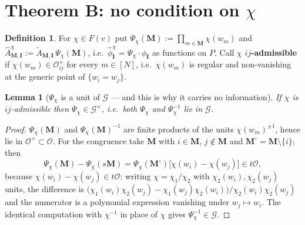 \documentclass[11pt]{article}
\theoremstyle{plain}
\newtheorem{lem}[thm]{Lemma}
\theoremstyle{definition}
\newtheorem{defn}[thm]{Definition}
\theoremstyle{remark}
\theoremstyle{plain}
\newcommand{\bI}{\mathbf{I}}
\newcommand{\bM}{\mathbf{M}}
\newcommand{\At}{\widetilde{A}}
\newcommand{\Ah}{\widehat{A}}
\newcommand{\sm}{\setminus}
\newcommand{\Gkm}{\mathcal{G}}
\begin{document}
\section{Theorem B: no condition on $\chi$}
\label{sec:thmB}

\begin{defn}
For $\chi\in F(v)$ put $\Psi_\chi(\bM):=\prod_{m\in\bM}\chi(w_m)$ and
$\Ah^{\chi}_{\bM,\bI}:=\At_{\bM,\bI}\,\Psi_\chi(\bM)$, i.e.\
$\hat\phi^{\chi}_\bI=\Psi_\chi\cdot\phi_\bI$ as functions on $P$.  Call $\chi$
\textbf{$ij$-admissible} if $\chi(w_m)\in\mathcal{O}_{ij}^{\times}$ for every
$m\in[N]$, i.e.\ $\chi(w_m)$ is regular and non-vanishing at the generic point of
$\{w_i=w_j\}$.
\end{defn}

\begin{lem}[$\Psi_\chi$ is a unit of $\Gkm$ --- and this is why it carries no information]
\label{lem:unit}
If $\chi$ is $ij$-admissible then $\Psi_\chi\in\Gkm^{\times}$, i.e.\ both
$\Psi_\chi$ and $\Psi_\chi^{-1}$ lie in $\Gkm$.
\end{lem}

\begin{proof}
$\Psi_\chi(\bM)$ and $\Psi_\chi(\bM)^{-1}$ are finite products of the units
$\chi(w_m)^{\pm1}$, hence lie in $\mathcal{O}^{\times}\subset\mathcal{O}$.  For
the congruence take $\bM$ with $i\in\bM$, $j\notin\bM$ and
$\bM^{\circ}=\bM\sm\{i\}$; then
\[
  \Psi_\chi(\bM)-\Psi_\chi(s\bM)
  =\Psi_\chi(\bM^{\circ})\bigl[\chi(w_i)-\chi(w_j)\bigr]\in t\mathcal{O},
\]
because $\chi(w_i)-\chi(w_j)\in t\mathcal{O}$: writing
$\chi=\chi_1/\chi_2$ with $\chi_2(w_i),\chi_2(w_j)$ units, the difference is
$\bigl(\chi_1(w_i)\chi_2(w_j)-\chi_1(w_j)\chi_2(w_i)\bigr)/\chi_2(w_i)\chi_2(w_j)$
and the numerator is a polynomial expression vanishing under $w_j\mapsto w_i$.
The identical computation with $\chi^{-1}$ in place of $\chi$ gives
$\Psi_\chi^{-1}\in\Gkm$.
\end{proof}
\end{document}
